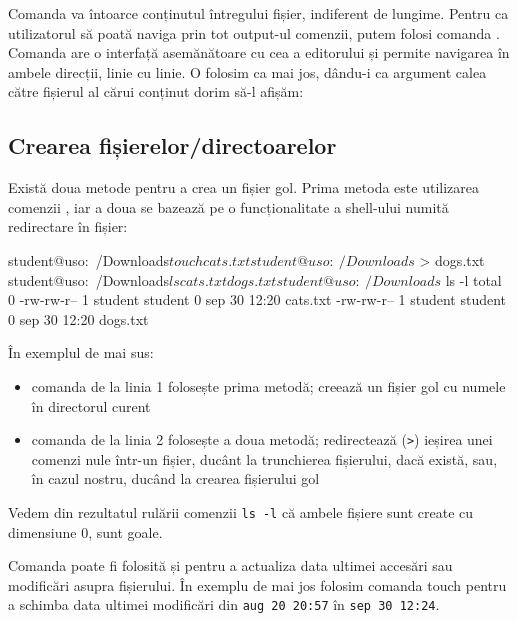 Comanda va întoarce conținutul întregului fișier, indiferent de lungime. Pentru
ca utilizatorul să poată naviga prin tot output-ul comenzii, putem folosi comanda
. Comanda  are o interfață asemănătoare cu cea a editorului  și
permite navigarea în ambele direcții, linie cu linie. O folosim ca mai jos, dându-i ca argument calea către fișierul al cărui conținut dorim să-l afișăm:


\subsection{Crearea fișierelor/directoarelor}
\label{sec:file-system-file-creation}

Există doua metode pentru a crea un fișier gol. Prima metoda este utilizarea
comenzii , iar a doua se bazează pe o funcționalitate
a shell-ului numită redirectare în fișier:

\begin{screen}
student@uso:~/Downloads$ touch cats.txt
student@uso:~/Downloads$ > dogs.txt
student@uso:~/Downloads$ ls
cats.txt  dogs.txt
student@uso:~/Downloads$ ls -l
total 0
-rw-rw-r-- 1 student student 0 sep 30 12:20 cats.txt
-rw-rw-r-- 1 student student 0 sep 30 12:20 dogs.txt
\end{screen}

În exemplul de mai sus:
\begin{itemize}
	\item comanda de la linia 1 folosește prima metodă; creează un fișier
		gol cu numele  în directorul curent
	\item comanda de la linia 2 folosește a doua metodă; redirectează
		(\texttt{>}) ieșirea unei comenzi nule într-un fișier, ducânt la trunchierea fișierului, dacă există, sau, în cazul nostru, ducând la crearea
                fișierului gol 
\end{itemize}
Vedem din rezultatul rulării comenzii \texttt{ls -l} că ambele fișiere sunt create cu dimensiune 0, sunt goale.

Comanda  poate fi folosită și pentru a actualiza data ultimei accesări sau
modificări asupra fișierului. În exemplu de mai jos folosim comanda touch pentru a schimba data ultimei modificări din \texttt{aug 20 20:57} în \texttt{sep 30 12:24}.

